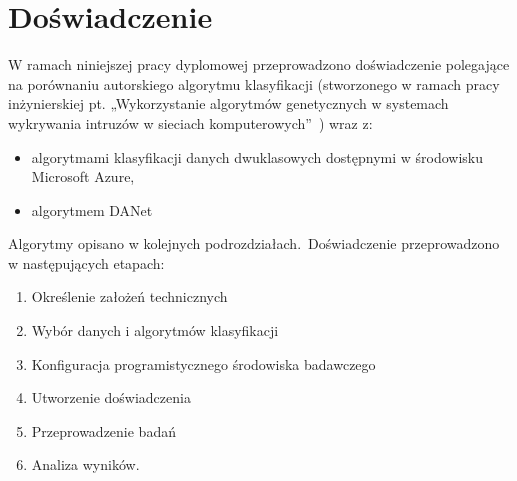\chapter{Doświadczenie}
\label{cha:dos}
W ramach niniejszej pracy dyplomowej przeprowadzono doświadczenie polegające na porównaniu autorskiego algorytmu klasyfikacji (stworzonego w ramach pracy inżynierskiej pt. „Wykorzystanie algorytmów genetycznych w systemach wykrywania intruzów w sieciach komputerowych”~\cite{Blyszcz2022}) wraz z:
\begin{itemize}
    \item algorytmami klasyfikacji danych dwuklasowych dostępnymi w środowisku Microsoft Azure,
    \item algorytmem DANet~\cite{Danet, Chen2022}
\end{itemize}
Algorytmy opisano w kolejnych podrozdziałach.\ Doświadczenie przeprowadzono w następujących etapach:
\begin{enumerate}
    \item Określenie założeń technicznych
    \item Wybór danych i algorytmów klasyfikacji
    \item Konfiguracja programistycznego środowiska badawczego
    \item Utworzenie doświadczenia
    \item Przeprowadzenie badań
    \item Analiza wyników.
\end{enumerate}


